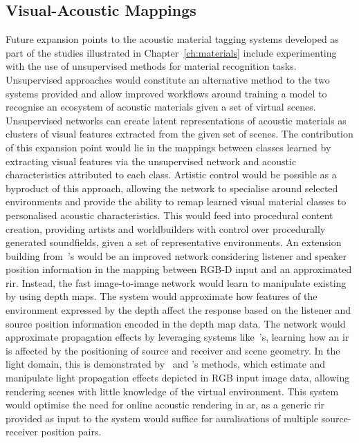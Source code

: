 \subsection{Visual-Acoustic Mappings}
Future expansion points to the acoustic material tagging systems developed as part of the studies illustrated in Chapter~\ref{ch:materials} include experimenting with the use of unsupervised methods for material recognition tasks. Unsupervised approaches would constitute an alternative method to the two systems provided and allow improved workflows around training a model to recognise an ecosystem of acoustic materials given a set of virtual scenes. Unsupervised networks can create latent representations of acoustic materials as clusters of visual features extracted from the given set of scenes. The contribution of this expansion point would lie in the mappings between classes learned by extracting visual features via the unsupervised network and acoustic characteristics attributed to each class. Artistic control would be possible as a byproduct of this approach, allowing the network to specialise around selected environments and provide the ability to remap learned visual material classes to personalised acoustic characteristics. This would feed into procedural content creation, providing artists and worldbuilders with control over procedurally generated soundfields, given a set of representative environments.
An extension building from~\cite{Singh_2021_ICCV}'s would be an improved network considering listener and speaker position information in the mapping between RGB-D input and an approximated \acrshort{rir}. Instead, the fast image-to-image network would learn to manipulate existing  by using depth maps. The system would approximate how features of the environment expressed by the depth affect the response based on the listener and source position information encoded in the depth map data. The network would approximate propagation effects by leveraging systems like~\cite{chen2022soundspaces}'s, learning how an \acrshort{ir} is affected by the positioning of source and receiver and scene geometry. In the light domain, this is demonstrated by~\cite{wang2020deep} and \cite{gardner2019deep}'s methods, which estimate and manipulate light propagation effects depicted in RGB input image data, allowing rendering scenes with little knowledge of the virtual environment. This system would optimise the need for online acoustic rendering in \acrshort{ar}, as a generic \acrshort{rir} provided as input to the system would suffice for auralisations of multiple source-receiver position pairs.\par

